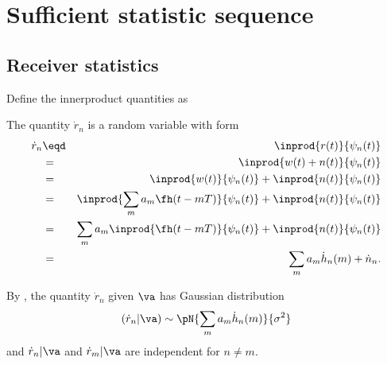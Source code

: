 \section{Sufficient statistic sequence}
\label{sec:fd_ml}
\subsection{Receiver statistics}
Define the innerproduct quantities as

The quantity $\dot{r}_n$ is a random variable with form
\begin{eqnarray*}
   \dot{r}_n
     &\eqd& \inprod{r(t)}{\psi_n(t)}
   \\&=&    \inprod{w(t)+n(t)}{\psi_n(t)}
   \\&=&    \inprod{w(t)}{\psi_n(t)} + \inprod{n(t)}{\psi_n(t)}
   \\&=&    \inprod{\sum_m a_m \fh(t-mT)}{\psi_n(t)} + \inprod{n(t)}{\psi_n(t)}
   \\&=&    \sum_m a_m \inprod{\fh(t-mT)}{\psi_n(t)} + \inprod{n(t)}{\psi_n(t)}
   \\&=&    \sum_m a_m \dot{h}_n(m) + \dot{n}_n.
\end{eqnarray*}

By ,
the quantity $\dot{r}_n$ given $\va $ has Gaussian distribution
\[
   (\dot{r}_n|\va ) \sim \pN{\sum_m a_m \dot{h}_n(m)}{\sigma^2}
\]
and $\dot{r}_n|\va $ and $\dot{r}_m|\va $ are independent for $n\ne m$.


